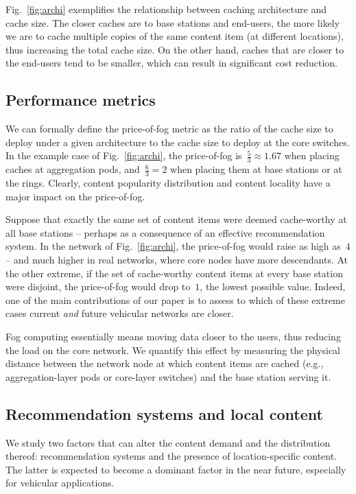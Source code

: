 \documentclass{sig-alternate-05-2015}
\newcommand{\Fig}[1]{Fig.~\ref{fig:#1}}
\begin{document}
\Fig{archi} exemplifies the relationship between caching architecture
and cache size. The closer caches are to base stations and end-users,
the more likely we are to cache multiple copies of the same content
item (at different locations), thus increasing the total cache
size. On the other hand, caches that are closer to the end-users tend to be smaller, which can result in significant cost reduction.

\subsection{Performance metrics}
\label{sec:metrics}

We can formally define the price-of-fog metric as the ratio of the cache size to deploy under a given architecture to the cache size to deploy at the core switches. In the example case of \Fig{archi}, the price-of-fog is~$\frac{5}{3}\approx 1.67$ when placing caches at aggregation pods, and~$\frac{6}{3}=2$ when placing them at base stations or at the rings. Clearly, content popularity distribution and content locality have a major impact on the price-of-fog.

Suppose that exactly the same set of content items were deemed cache-worthy at all base stations -- perhaps as a consequence of an effective recommendation system. In the network of \Fig{archi}, the price-of-fog would raise as high as~$4$ -- and much higher in real networks, where core nodes have more descendants. At the other extreme, if the set of cache-worthy content items at every base station were disjoint, the price-of-fog would drop to~$1$, the lowest possible value. Indeed, one of the main contributions of our paper is to assess to which of these extreme cases current {\em and} future vehicular networks are closer.

Fog computing essentially means moving data closer to the users, thus reducing the load on the core network. We quantify this effect by measuring the physical distance between the network node at which content items are cached (e.g., aggregation-layer pods or core-layer switches) and the base station serving it.

\subsection{Recommendation systems and local content}
\label{sec:recloc}

We study two factors that can alter the content demand and the distribution thereof: recommendation systems and the presence of location-specific content. The latter is expected to become a dominant factor in the near future, especially for vehicular applications.
\end{document}
